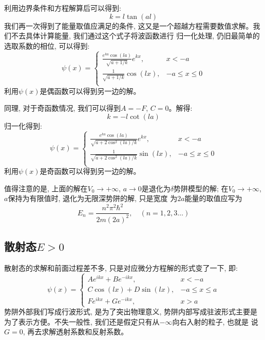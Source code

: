 \documentclass[a4paper,zihao=-4,linespread=1]{ctexrep}
\begin{document}
    利用边界条件和方程解算后可以得到:$$k=l\tan(al)$$我们再一次得到了能量取值应满足的条件, 这又是一个超越方程需要数值求解。我们不去具体计算能量, 我们通过这个式子将波函数进行
    归一化处理, 仍旧最简单的选取系数的相位, 可以得到:
    \begin{equation}
        \psi(x)=\begin{cases}
            \frac{e^{ka}\cos(la)}{\sqrt{a+1/k}}e^{kx},&x<-a\\
            \frac{1}{\sqrt{a+1/k}}\cos(lx),&-a\leq x\leq 0\\
        \end{cases}
    \end{equation}
    利用$\psi(x)$是偶函数可以得到另一边的解。

    同理, 对于奇函数情况, 我们可以得到$A=-F$, $C=0$。解得:$$k=-l\cot (la)$$归一化得到:
    \begin{equation}
        \psi(x)=\begin{cases}
            \frac{e^{ka}\cos(la)}{\sqrt{a+2\cos^2(la)/k}}e^{kx},&x<-a\\
            \frac{1}{\sqrt{a+2\cos^2(la)/k}}\sin(lx),&-a\leq x\leq 0\\
        \end{cases}
    \end{equation}
    利用$\psi(x)$是奇函数可以得到另一边的解。

    值得注意的是, 上面的解在$V_0\to+\infty$, $a\to 0$是退化为$\delta $势阱模型的解; 在$V_0\to +\infty$, $a$保持为有限值时, 退化为无限深势阱的解, 只是宽度
    为$2a$能量的取值应写为$$E_n=\frac{n^2\pi^2\hbar^2}{2m(2a)^2},\quad(n=1,2,3\ldots)$$
    \subsection*{散射态$E>0$}
    散射态的求解和前面过程差不多, 只是对应微分方程解的形式变了一下, 即:
    \begin{equation}
        \psi(x)=\begin{cases}
            Ae^{ikx}+Be^{-ikx},&x<-a\\
            C\cos(lx)+D\sin(lx),&-a\leq x\leq a\\
            Fe^{ikx}+Ge^{-ikx},&x>a
        \end{cases}
    \end{equation}
    势阱外部我们写成行波形式, 是为了突出物理意义, 势阱内部写成驻波形式主要是为了表示方便。不失一般性, 我们还是假定只有从$-\infty$向右入射的粒子, 也就是
    说$G=0$, 再去求解透射系数和反射系数。
\end{document}
